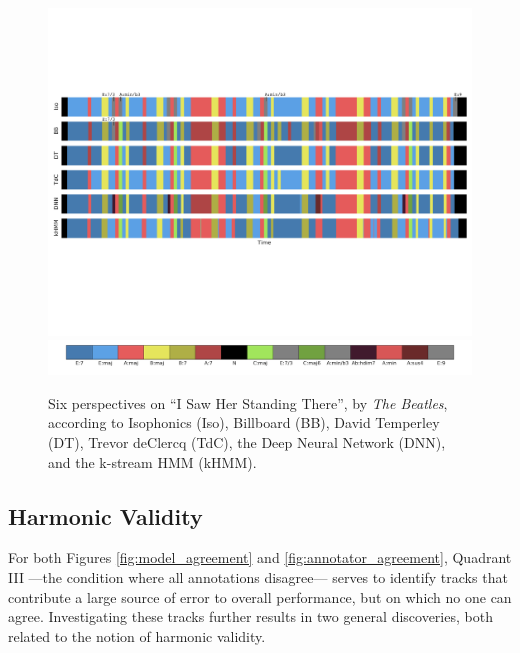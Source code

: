 \documentclass{article}
\begin{document}
\begin{figure}[t!]
\centering
\includegraphics[width=\textwidth]{TROSSUK149E3AE03BD_annotations_mkup2}
\includegraphics[width=\textwidth]{TROSSUK149E3AE03BD_legend}
\caption{Six perspectives on ``I Saw Her Standing There'', by \emph{The Beatles}, according to Isophonics (Iso), Billboard (BB), David Temperley (DT), Trevor deClercq (TdC), the Deep Neural Network (DNN), and the k-stream HMM (kHMM).}
\label{fig:beatles}
\end{figure}


\subsection{Harmonic Validity}
\label{subsec:validity}

For both Figures \ref{fig:model_agreement} and \ref{fig:annotator_agreement}, Quadrant III ---the condition where all annotations disagree--- serves to identify tracks that contribute a large source of error to overall performance, but on which no one can agree.
Investigating these tracks further results in two general discoveries, both related to the notion of harmonic validity.

\end{document}
